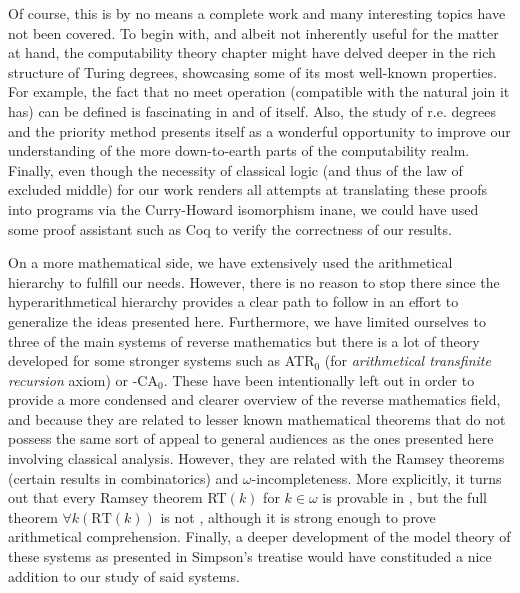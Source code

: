 \documentclass[../main.tex]{memoir}
\begin{document}
Of course, this is by no means a complete work and many interesting topics have not been covered. To begin with, and albeit not inherently useful for the matter at hand, the computability theory chapter might have delved deeper in the rich structure of Turing degrees, showcasing some of its most well-known properties. For example, the fact that no meet operation (compatible with the natural join it has) can be defined is fascinating in and of itself. Also, the study of r.e. degrees and the priority method presents itself as a wonderful opportunity to improve our understanding of the more down-to-earth parts of the computability realm. Finally, even though the necessity of classical logic (and thus of the law of excluded middle) for our work renders all attempts at translating these proofs into programs via the Curry-Howard isomorphism inane, we could have used some proof assistant such as Coq to verify the correctness of our results.

On a more mathematical side, we have extensively used the arithmetical hierarchy to fulfill our needs. However, there is no reason to stop there since the hyperarithmetical hierarchy provides a clear path to follow in an effort to generalize the ideas presented here. Furthermore, we have limited ourselves to three of the main systems of reverse mathematics but there is a lot of theory developed for some stronger systems such as ATR$_0$ (for \textit{arithmetical transfinite recursion} axiom) or -CA$_0$. These have been intentionally left out in order to provide a more condensed and clearer overview of the reverse mathematics field, and because they are related to lesser known mathematical theorems that do not possess the same sort of appeal to general audiences as the ones presented here involving classical analysis. However, they are related with the Ramsey theorems (certain results in combinatorics) and $\omega$-incompleteness. More explicitly, it turns out that every Ramsey theorem RT$(k)$ for $k \in \omega$ is provable in \aca, but the full theorem $\forall k (\text{RT}(k))$ is not \cite{stillwell}, although it is strong enough to prove arithmetical comprehension. Finally, a deeper development of the model theory of these systems as presented in Simpson's treatise \cite{simpson} would have constituded a nice addition to our study of said systems.
\end{document}
